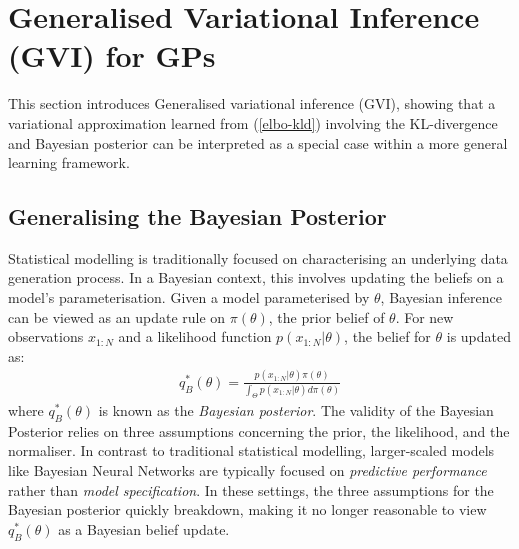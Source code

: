 \documentclass{article}
\numberwithin{equation}{section}
\begin{document}
\newpage
\section{Generalised Variational Inference (GVI) for GPs}
This section introduces Generalised variational inference (GVI), showing that a variational approximation learned from (\ref{elbo-kld}) involving the KL-divergence and Bayesian posterior can be interpreted as a special case within a more general learning framework.

\subsection{Generalising the Bayesian Posterior}
Statistical modelling is traditionally focused on characterising an underlying data generation process. In a Bayesian context, this involves updating the beliefs on a model's parameterisation. Given a model parameterised by $\theta$, Bayesian inference can be viewed as an update rule on $\pi(\theta)$, the prior belief of $\theta$. For new observations $x_{1:N}$ and a likelihood function $p(x_{1:N}|\theta)$, the belief for $\theta$ is updated as:
\begin{align}
q_B^*(\theta) = \frac{p(x_{1:N}|\theta) \pi(\theta)}{\int_{\Theta} p(x_{1:N}|\theta) d \pi(\theta)}
\label{bayesian-posterior}
\end{align}
where $q_B^*(\theta)$ is known as the \textit{Bayesian posterior}. The validity of the Bayesian Posterior relies on three assumptions concerning the prior, the likelihood, and the normaliser. In contrast to traditional statistical modelling, larger-scaled models like Bayesian Neural Networks are typically focused on \textit{predictive performance} rather than \textit{model specification}. In these settings, the three  assumptions for the Bayesian posterior quickly breakdown, making it no longer reasonable to view $q_B^*(\theta)$ as a Bayesian belief update.
\end{document}
